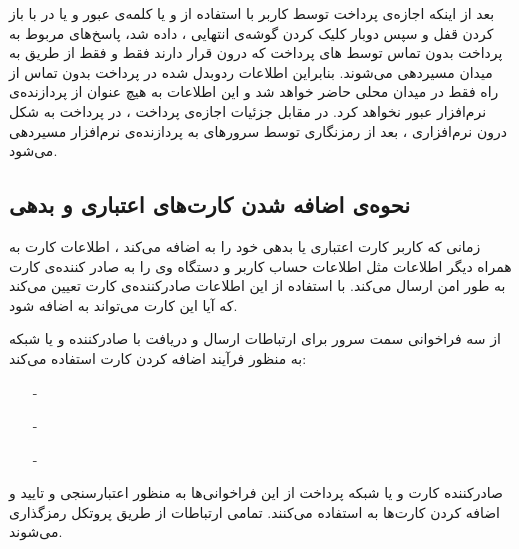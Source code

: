 \documentclass[oneside]{report}
\begin{document}
   	بعد از اینکه اجازه‌ی پرداخت توسط کاربر با استفاده از 
   	{\normalsize {}}
   	و یا کلمه‌ی عبور 
   	و یا در 
   	{\normalsize {}} با باز کردن قفل و سپس دوبار کلیک کردن گوشه‌ی انتهایی ، داده شد، پاسخ‌های مربوط به پرداخت بدون تماس توسط 
   	{\normalsize {}} های پرداخت 
   	که درون 
   	{\normalsize {}}
   	قرار دارند فقط و فقط از طریق 
   	{\normalsize {}}
   	به میدان 
   	{\normalsize {}}
   	مسیردهی می‌شوند. بنابراین اطلاعات ردوبدل شده در پرداخت بدون تماس از راه 
   	   	{\normalsize {}}
   	   	فقط در میدان 
   	   	   	{\normalsize {}}
   	  محلی حاضر خواهد شد و این اطلاعات به هیچ عنوان از پردازنده‌ی نرم‌افزار عبور نخواهد کرد.
   	  در مقابل جزئیات اجازه‌ی پرداخت  ، در پرداخت به شکل درون نرم‌افزاری ، بعد از رمزنگاری توسط سرورهای 
   	     	{\normalsize {}}
   	   به پردازنده‌ی نرم‌افزار مسیردهی می‌شود.
   	   
   \subsection{نحوه‌ی اضافه شدن کارت‌های اعتباری و بدهی}
   	زمانی که کاربر کارت اعتباری یا بدهی خود را به 
   	   	   	   	{\normalsize {}}
   	 اضافه می‌کند ، 
   	    	   	   	{\normalsize {}} 
   	 اطلاعات کارت به همراه دیگر اطلاعات مثل اطلاعات حساب کاربر و دستگاه وی را به صادر کننده‌ی کارت به طور امن ارسال می‌کند. با استفاده از این اطلاعات صادرکننده‌ی کارت تعیین می‌کند که آیا این کارت می‌تواند به 
   	    	   	   	{\normalsize {}}
   	    	   	   اضافه شود.
   	    	   	   
   	{\normalsize {}} 
   	از سه فراخوانی سمت سرور برای ارتباطات ارسال و دریافت با صادرکننده‌ و یا شبکه به منظور فرآیند اضافه کردن کارت استفاده می‌کند:
   	\begin{itemize}
   		\item[-]    	{\normalsize {}}
   		\item[-] 	   	{\normalsize {}}
   		\item[-]	   	{\normalsize {}}  
   	\end{itemize}
   	      صادرکننده کارت و یا شبکه پرداخت از این فراخوانی‌ها به منظور اعتبارسنجی و تایید و اضافه کردن کارت‌ها به 
   	         	{\normalsize {}} 
   	         	استفاده می‌کنند.
  تمامی ارتباطات 
     	{\normalsize {}} 
     	از طریق پروتکل 
     	   	{\normalsize {}} 
     	   	رمزگذاری می‌شوند.       					       
     	   	
\end{document}
